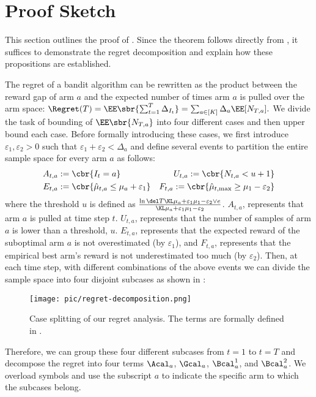 \section{Proof Sketch} \label{sec:proof-sketch} 

This section outlines the proof of . Since the theorem follows directly from , it suffices to demonstrate the regret decomposition and explain how these propositions are established.

The regret of a bandit algorithm can be rewritten as the product between the reward gap of arm $a$ and the expected number of times arm $a$ is pulled over the arm space:
$
    \Regret(T) = \textstyle\EE\sbr{\sum_{t=1}^T \Delta_{I_t}} = \sum_{a\in[K]} \Delta_a \EE[N_{T, a}].
$
We divide the task of bounding of $\EE\sbr{N_{T, a}}$ into four different cases and then upper bound each case. Before formally introducing these cases, we first introduce $\varepsilon_1, \varepsilon_2 > 0$ such that $\varepsilon_1 + \varepsilon_2 < \Delta_a$ and define several events to partition the entire sample space for every arm $a$ as follows:
\begin{align}
    A_{t,a} &:= \cbr{I_t = a}
    &U_{t,a} := \cbr{N_{t,a} < u + 1} \nonumber \\
    E_{t,a} &:= \cbr{\hmu_{t,a} \leq \mu_a+{\varepsilon_1}}
    &F_{t,a} := \cbr{\hmu_{t,\max} \geq \mu_1-{\varepsilon_2}} \label{eqn:subcases}
\end{align}
where the threshold $u$ is defined as $\expDefU$.
$A_{t, a}$, represents that arm $a$ is pulled at time step $t$. 
$U_{t, a}$, represents that the number of samples of arm $a$ is lower than 
a threshold, $u$. 
$E_{t, a}$, represents that the expected reward of the suboptimal arm $a$ is not overestimated (by $\varepsilon_1$), and $F_{t, a}$, represents that the empirical best arm's reward is not underestimated too much (by $\varepsilon_2$).
Then, at each time step, with different combinations of the above events we can divide the sample space into four disjoint subcases as shown in :

\begin{figure}[ht]
    \centering
    \texttt{[image: pic/regret-decomposition.png]}
    \caption{Case splitting of our regret analysis. The terms are formally defined in .}
    \label{fig:case-split}
\end{figure}


Therefore, we can group these four different subcases from $t=1$ to $t=T$ and decompose the regret into four terms $\Acal_a$, $\Gcal_a$, $\Bcal^1_a$, and $\Bcal^2_a$. We overload symbols and use the subscript $a$ to indicate the specific arm to which the subcases belong.

